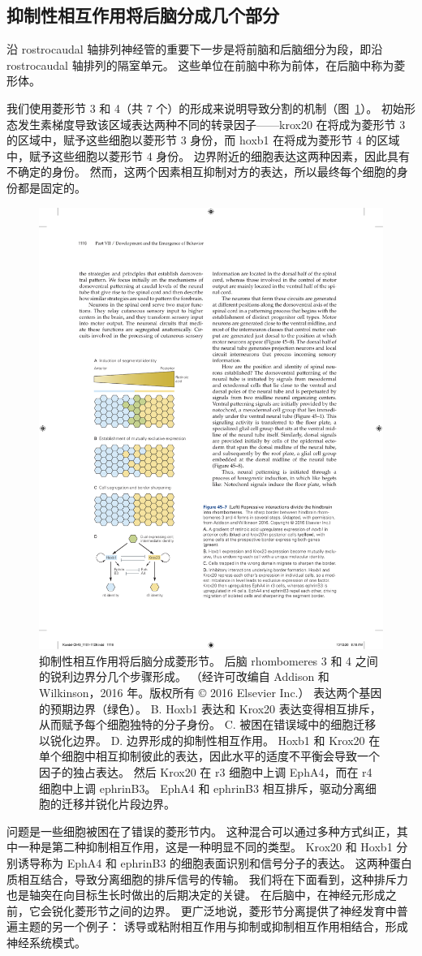 \subsection{抑制性相互作用将后脑分成几个部分}

沿 rostrocaudal 轴排列神经管的重要下一步是将前脑和后脑细分为段，即沿 rostrocaudal 轴排列的隔室单元。
这些单位在前脑中称为前体，在后脑中称为菱形体。


我们使用菱形节 3 和 4（共 7 个）的形成来说明导致分割的机制（图~\ref{fig:45_7}）。
初始形态发生素梯度导致该区域表达两种不同的转录因子——krox20 在将成为菱形节 3 的区域中，赋予这些细胞以菱形节 3 身份，而 hoxb1 在将成为菱形节 4 的区域中，赋予这些细胞以菱形节 4 身份。
边界附近的细胞表达这两种因素，因此具有不确定的身份。
然而，这两个因素相互抑制对方的表达，所以最终每个细胞的身份都是固定的。


\begin{figure}[htbp]
	\centering
	\includegraphics[width=0.5\linewidth]{chap45/fig_45_7}
	\caption{抑制性相互作用将后脑分成菱形节。 后脑 rhombomeres 3 和 4 之间的锐利边界分几个步骤形成。 （经许可改编自 Addison 和 Wilkinson，2016 年。版权所有 © 2016 Elsevier Inc.） 表达两个基因的预期边界（绿色）。 B. Hoxb1 表达和 Krox20 表达变得相互排斥，从而赋予每个细胞独特的分子身份。 C. 被困在错误域中的细胞迁移以锐化边界。 D. 边界形成的抑制性相互作用。 Hoxb1 和 Krox20 在单个细胞中相互抑制彼此的表达，因此水平的适度不平衡会导致一个因子的独占表达。 然后 Krox20 在 r3 细胞中上调 EphA4，而在 r4 细胞中上调 ephrinB3。 EphA4 和 ephrinB3 相互排斥，驱动分离细胞的迁移并锐化片段边界。}
	\label{fig:45_7}
\end{figure}


问题是一些细胞被困在了错误的菱形节内。
这种混合可以通过多种方式纠正，其中一种是第二种抑制相互作用，这是一种明显不同的类型。
Krox20 和 Hoxb1 分别诱导称为 EphA4 和 ephrinB3 的细胞表面识别和信号分子的表达。
这两种蛋白质相互结合，导致分离细胞的排斥信号的传输。
我们将在下面看到，这种排斥力也是轴突在向目标生长时做出的后期决定的关键。
在后脑中，在神经元形成之前，它会锐化菱形节之间的边界。
更广泛地说，菱形节分离提供了神经发育中普遍主题的另一个例子：
诱导或粘附相互作用与抑制或抑制相互作用相结合，形成神经系统模式。



